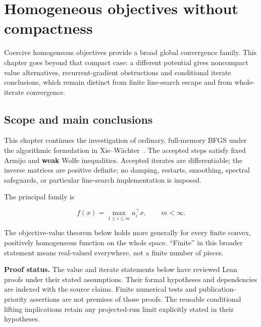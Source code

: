 \chapter{Homogeneous objectives without compactness}\label{comp:H}\label{H:chapter}
\renewcommand{\ModuleTag}{7}
Coercive homogeneous objectives provide a broad global convergence family. This chapter goes beyond that compact case: a different potential gives noncompact value alternatives, recurrent-gradient obstructions and conditional iterate conclusions, which remain distinct from finite line-search escape and from whole-iterate convergence.


\begingroup

\setcounter{section}{0}
\setcounter{theorem}{0}
\setcounter{lemma}{0}
\setcounter{corollary}{0}
\setcounter{proposition}{0}
\setcounter{remark}{0}
\setcounter{equation}{0}


\section{Scope and main
conclusions}\label{H:scope-and-main-conclusions}

This chapter continues the investigation of ordinary, full-memory BFGS
under the algorithmic formulation in Xie--W\"achter~\cite{XW}. The accepted
steps satisfy fixed Armijo and \textbf{weak} Wolfe inequalities.
Accepted iterates are differentiable; the inverse matrices are positive
definite; no damping, restarts, smoothing, spectral safeguards, or
particular line-search implementation is imposed.

The principal family is

\[
f(x)=\max_{1\le i\le m}a_i^\top x,\qquad m<\infty.
\]

The objective-value theorem below holds more generally for every finite
convex, positively homogeneous function on the whole space. ``Finite''
in this broader statement means real-valued everywhere, not a finite
number of pieces.

\textbf{Proof status.} The value and iterate statements below have reviewed Lean proofs under their stated assumptions. Their formal hypotheses and dependencies are indexed with the source claims. Finite numerical tests and publication-priority assertions are not premises of those proofs. The reusable conditional lifting implications retain any projected-run limit explicitly stated in their hypotheses.



